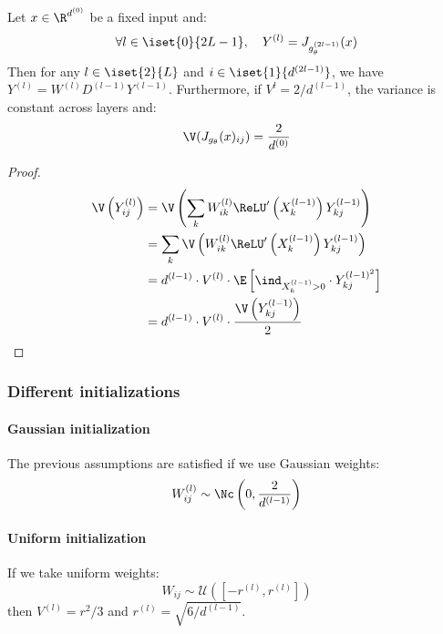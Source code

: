 \begin{property}
    Let $x\in\R^{d^{(0)}}$ be a fixed input and:
    \begin{equation}
        \forall l\in\iset{0}{2L-1}, \quad Y^{(l)}=J_{g_\theta^{(2l-1)}}(x)
    \end{equation}
    Then for any $l\in\iset{2}{L}$ and $i\in\iset{1}{d^{(2l-1)}}$, we have $Y^{(l)} = W^{(l)}D^{(l-1)}Y^{(l-1)}$. Furthermore, if $V^{l}=2/d^{(l-1)}$, the variance is constant across layers and:
    \begin{equation*}
        \V(J_{g_\theta}(x)_{ij}) = \frac{2}{d^{(0)}}
    \end{equation*}
\end{property}
\begin{proof}
    \begin{equation*}
        \begin{aligned}
            \V\left(Y_{ij}^{(l)}\right) &= \V\left(\sum_kW_{ik}^{(l)}\ReLU'\left(X_k^{(l-1)}\right) Y_{kj}^{(l-1)}\right)\\
            &= \sum_k \V\left(W_{ik}^{(l)} \ReLU'\left(X_k^{(l-1)}\right) Y_{kj}^{(l-1)}\right)\\
            &= d^{(l-1)} \cdot V^{(l)}\cdot \E\left[\ind_{X_k^{(l-1)}>0}\cdot Y_{kj}^{(l-1)^2}\right]\\
            &= d^{(l-1)} \cdot V^{(l)}\cdot \frac{\V\left(Y_{kj}^{(l-1)}\right)}{2}\\
        \end{aligned}
    \end{equation*}
\end{proof}

\subsubsection{Different initializations}
\paragraph*{Gaussian initialization} The previous assumptions are satisfied if we use Gaussian weights:
\begin{equation*}
    W_{ij}^{(l)} \sim \Nc\left(0, \frac{2}{d^{(l-1)}}\right)
\end{equation*}

\paragraph*{Uniform initialization}
If we take uniform weights:
\begin{equation*}
    W_{ij} \sim \mathcal{U}([-r^{(l)}, r^{(l)}])
\end{equation*}
then $V^{(l)}=r^2/3$ and $r^{(l)}=\sqrt{6/d^{(l-1)}}$.

